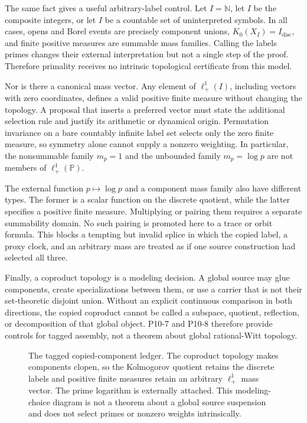 \documentclass[11pt]{article}
\theoremstyle{definition}
\newcommand{\N}{\mathbb N}
\newcommand{\Pp}{\mathbb P}
\newcommand{\Kzero}{K_0}
\begin{document}
The same fact gives a useful arbitrary-label control.  Let $I=\N$, let $I$ be the composite integers, or let $I$ be a countable set of uninterpreted symbols.  In all cases, opens and Borel events are precisely component unions, $\Kzero(X_I)=I_{\mathrm{disc}}$, and finite positive measures are summable mass families.  Calling the labels primes changes their external interpretation but not a single step of the proof.  Therefore primality receives no intrinsic topological certificate from this model.

Nor is there a canonical mass vector.  Any element of $\ell^1_+(I)$, including vectors with zero coordinates, defines a valid positive finite measure without changing the topology.  A proposal that inserts a preferred vector must state the additional selection rule and justify its arithmetic or dynamical origin.  Permutation invariance on a bare countably infinite label set selects only the zero finite measure, so symmetry alone cannot supply a nonzero weighting.  In particular, the nonsummable family $m_p=1$ and the unbounded family $m_p=\log p$ are not members of $\ell^1_+(\Pp)$.

The external function $p\mapsto\log p$ and a component mass family also have different types.  The former is a scalar function on the discrete quotient, while the latter specifies a positive finite measure.  Multiplying or pairing them requires a separate summability domain.  No such pairing is promoted here to a trace or orbit formula.  This blocks a tempting but invalid splice in which the copied label, a proxy clock, and an arbitrary mass are treated as if one source construction had selected all three.

Finally, a coproduct topology is a modeling decision.  A global source may glue components, create specializations between them, or use a carrier that is not their set-theoretic disjoint union.  Without an explicit continuous comparison in both directions, the copied coproduct cannot be called a subspace, quotient, reflection, or decomposition of that global object.  P10-7 and P10-8 therefore provide controls for tagged assembly, not a theorem about global rational-Witt topology.

\begin{figure}[htbp]
\centering
\resizebox{0.98\textwidth}{!}{}
\caption{The tagged copied-component ledger.  The coproduct topology makes components clopen, so the Kolmogorov quotient retains the discrete labels and positive finite measures retain an arbitrary $\ell^1_+$ mass vector.  The prime logarithm is externally attached.  This modeling-choice diagram is not a theorem about a global source suspension and does not select primes or nonzero weights intrinsically.}
\label{fig:coproduct}
\end{figure}
\end{document}
